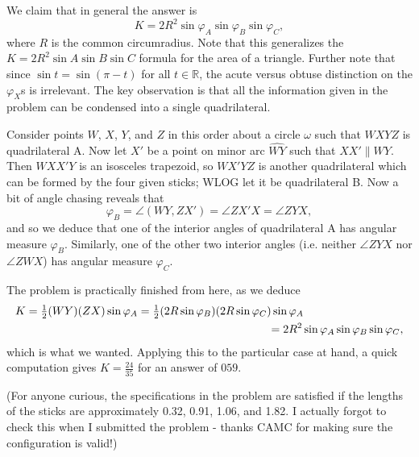 \begin{solution}[name={Solution by David Altizio}]
	We claim that in general the answer is\[K = 2R^2\sin\varphi_A\sin\varphi_B\sin\varphi_C,\]where $R$ is the common circumradius. Note that this generalizes the $K = 2R^2\sin A\sin B\sin C$ formula for the area of a triangle. Further note that since $\sin t = \sin(\pi-t)$ for all $t\in\mathbb R$, the acute versus obtuse distinction on the $\varphi_X$s is irrelevant. The key observation is that all the information given in the problem can be condensed into a single quadrilateral.
	
	Consider points $W$, $X$, $Y$, and $Z$ in this order about a circle $\omega$ such that $WXYZ$ is quadrilateral A. Now let $X'$ be a point on minor arc $\widehat{WY}$ such that $XX'\parallel WY$. Then $WXX'Y$ is an isosceles trapezoid, so $WX'YZ$ is another quadrilateral which can be formed by the four given sticks; WLOG let it be quadrilateral B. Now a bit of angle chasing reveals that\[\varphi_B = \angle(WY,ZX') = \angle ZX'X = \angle ZYX,\]and so we deduce that one of the interior angles of quadrilateral A has angular measure $\varphi_B$. Similarly, one of the other two interior angles (i.e. neither $\angle ZYX$ nor $\angle ZWX$) has angular measure $\varphi_C$.
	
	The problem is practically finished from here, as we deduce\begin{align*}K &= \tfrac12(WY)(ZX)\sin\varphi_A = \tfrac12(2R\sin\varphi_B)(2R\sin\varphi_C)\sin\varphi_A \\&\hspace{50ex}= 2R^2\sin\varphi_A\sin\varphi_B\sin\varphi_C,\end{align*}which is what we wanted. Applying this to the particular case at hand, a quick computation gives $K = \tfrac{24}{35}$ for an answer of $\boxed{059}$.
	
	(For anyone curious, the specifications in the problem are satisfied if the lengths of the sticks are approximately 0.32, 0.91, 1.06, and 1.82. I actually forgot to check this when I submitted the problem - thanks CAMC for making sure the configuration is valid!)
\end{solution}






















